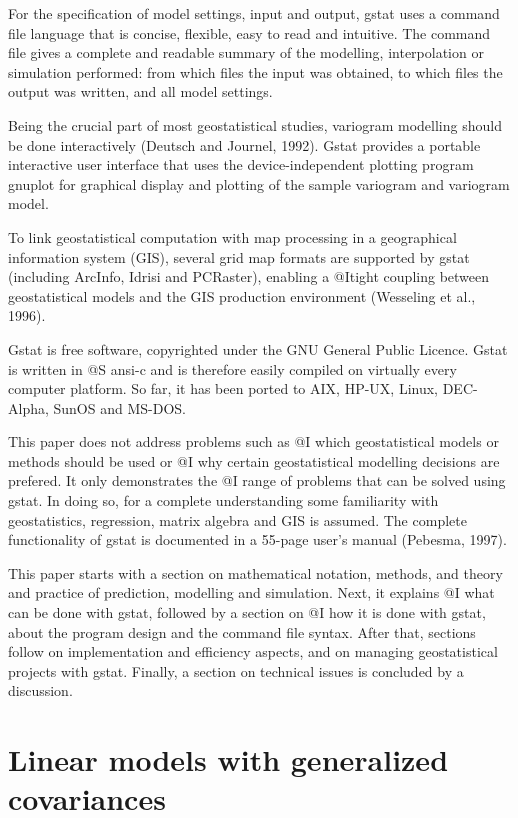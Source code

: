 \documentclass{article}
\begin{document}
For the specification of model settings, input and output, gstat uses a
command file language that is concise, flexible, easy to read and
intuitive. The command file gives a complete and readable summary of the
modelling, interpolation or simulation performed: from which files the
input was obtained, to which files the output was written, and all model
settings.

Being the crucial part of most geostatistical studies, variogram
modelling should be done interactively (Deutsch and Journel, 1992).
Gstat provides a portable interactive user interface that uses the
device-independent plotting program gnuplot for graphical display and
plotting of the sample variogram and variogram model.

To link geostatistical computation with map processing in a geographical
information system (GIS), several grid map formats are supported by
gstat (including ArcInfo, Idrisi and PCRaster), enabling a @I{tight
coupling} between geostatistical models and the GIS production
environment (Wesseling et al., 1996).

Gstat is free software, copyrighted under the GNU General Public
Licence. Gstat is written in @S ansi-c and is therefore easily compiled
on virtually every computer platform. So far, it has been ported to AIX,
HP-UX, Linux, DEC-Alpha, SunOS and MS-DOS.

This paper does not address problems such as @I which geostatistical
models or methods should be used or @I why certain geostatistical
modelling decisions are prefered. It only demonstrates the @I range of
problems that can be solved using gstat. In doing so, for a complete
understanding some familiarity with geostatistics, regression, matrix
algebra and GIS is assumed. The complete functionality of gstat is
documented in a 55-page user's manual (Pebesma, 1997).

This paper starts with a section on mathematical notation, methods, and
theory and practice of prediction, modelling and simulation. Next, it
explains @I what can be done with gstat, followed by a section on @I how
it is done with gstat, about the program design and the command file
syntax.  After that, sections follow on implementation and efficiency
aspects, and on managing geostatistical projects with gstat. Finally, a
section on technical issues is concluded by a discussion.

\section{Linear models with generalized covariances}
\label{ linear }
\end{document}
